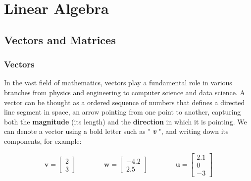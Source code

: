 \documentclass[
	11pt, %
	fleqn, %
	a4paper, %
]{LegrandOrangeBook}
\begin{document}

\part{Linear Algebra}


\chapterspaceabove{6.75cm} %
\chapterspacebelow{7.25cm} %


\chapter{Vectors and Matrices}

\section{Vectors}

In the vast field of mathematics, vectors play a fundamental role in various branches from physics and engineering to computer science and data science.
A vector can be thought as a ordered sequence of numbers that defines a directed line segment in space, an arrow pointing from one point to another, capturing both the \textbf{magnitude} (its length) and
the \textbf{direction} in which it is pointing. We can denote a vector using a bold letter such as " \textbf{\emph{v}} ", and writing down its components, for example:


$$ \textbf{v} =
	\begin{bmatrix}
		2 \\
		3
	\end{bmatrix} \quad\quad\quad\quad \textbf{w} = \begin{bmatrix} -4.2 \\ 2.5 \end{bmatrix} \quad\quad\quad\quad \textbf{u} = \begin{bmatrix} 2.1 \\ 0 \\ -3  \end{bmatrix}
$$
\end{document}
